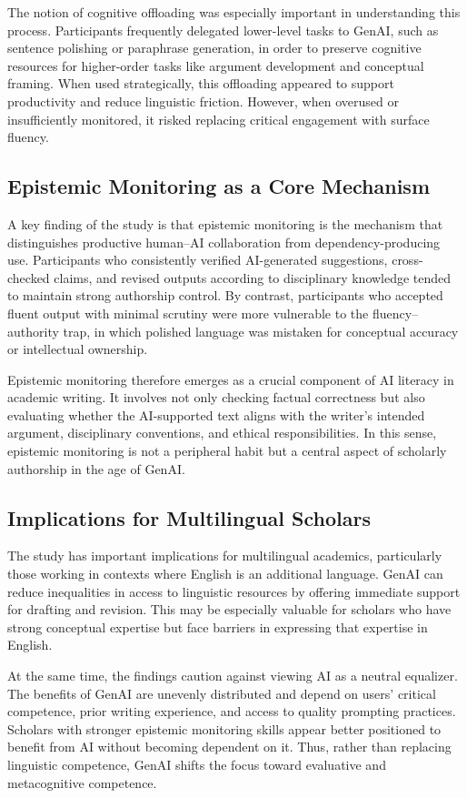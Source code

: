 \documentclass[12pt]{article}
\begin{document}
The notion of cognitive offloading was especially important in understanding this process. Participants frequently delegated lower-level tasks to GenAI, such as sentence polishing or paraphrase generation, in order to preserve cognitive resources for higher-order tasks like argument development and conceptual framing. When used strategically, this offloading appeared to support productivity and reduce linguistic friction. However, when overused or insufficiently monitored, it risked replacing critical engagement with surface fluency.

\subsection{Epistemic Monitoring as a Core Mechanism}
A key finding of the study is that epistemic monitoring is the mechanism that distinguishes productive human--AI collaboration from dependency-producing use. Participants who consistently verified AI-generated suggestions, cross-checked claims, and revised outputs according to disciplinary knowledge tended to maintain strong authorship control. By contrast, participants who accepted fluent output with minimal scrutiny were more vulnerable to the fluency--authority trap, in which polished language was mistaken for conceptual accuracy or intellectual ownership.

Epistemic monitoring therefore emerges as a crucial component of AI literacy in academic writing. It involves not only checking factual correctness but also evaluating whether the AI-supported text aligns with the writer's intended argument, disciplinary conventions, and ethical responsibilities. In this sense, epistemic monitoring is not a peripheral habit but a central aspect of scholarly authorship in the age of GenAI.

\subsection{Implications for Multilingual Scholars}
The study has important implications for multilingual academics, particularly those working in contexts where English is an additional language. GenAI can reduce inequalities in access to linguistic resources by offering immediate support for drafting and revision. This may be especially valuable for scholars who have strong conceptual expertise but face barriers in expressing that expertise in English.

At the same time, the findings caution against viewing AI as a neutral equalizer. The benefits of GenAI are unevenly distributed and depend on users' critical competence, prior writing experience, and access to quality prompting practices. Scholars with stronger epistemic monitoring skills appear better positioned to benefit from AI without becoming dependent on it. Thus, rather than replacing linguistic competence, GenAI shifts the focus toward evaluative and metacognitive competence.
\end{document}
